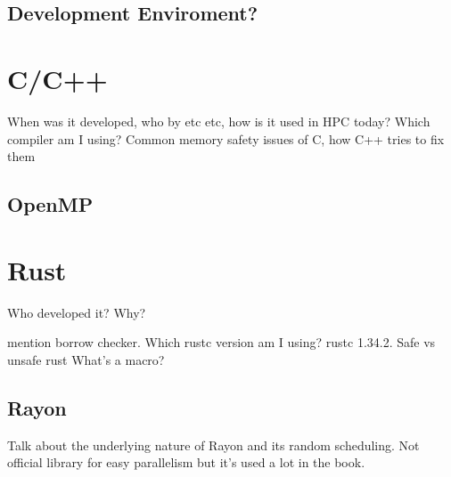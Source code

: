 \subsection{Development Enviroment?}

\section{C/C++}
When was it developed, who by etc etc, how is it used in HPC today? Which compiler am I using? Common memory safety issues of C, how C++ tries to fix them
\subsection{OpenMP}

\section{Rust}
Who developed it? Why?

mention borrow checker. Which rustc version am I using? rustc 1.34.2. Safe vs unsafe rust
What's a macro?
\subsection{Rayon}
Talk about the underlying nature of Rayon and its random scheduling. Not official library for easy parallelism but it's used a lot in the book.
